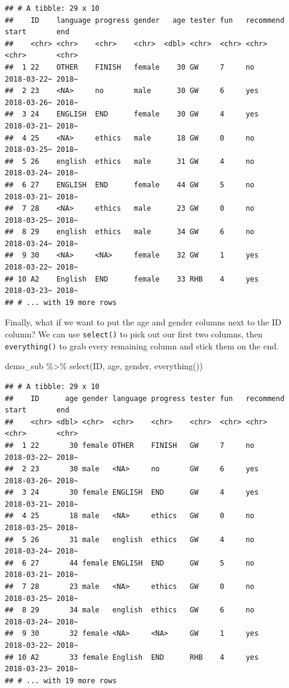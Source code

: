 \documentclass[
]{book}
\newenvironment{Shaded}{\begin{snugshade}}{\end{snugshade}}
\newcommand{\FunctionTok}[1]{\textcolor[rgb]{0.00,0.00,0.00}{#1}}
\newcommand{\NormalTok}[1]{#1}
\newcommand{\SpecialCharTok}[1]{\textcolor[rgb]{0.00,0.00,0.00}{#1}}
\begin{document}
\begin{verbatim}
## # A tibble: 29 x 10
##    ID    language progress gender   age tester fun   recommend start       end  
##    <chr> <chr>    <chr>    <chr>  <dbl> <chr>  <chr> <chr>     <chr>       <chr>
##  1 22    OTHER    FINISH   female    30 GW     7     no        2018-03-22~ 2018~
##  2 23    <NA>     no       male      30 GW     6     yes       2018-03-26~ 2018~
##  3 24    ENGLISH  END      female    30 GW     4     yes       2018-03-21~ 2018~
##  4 25    <NA>     ethics   male      18 GW     0     no        2018-03-25~ 2018~
##  5 26    english  ethics   male      31 GW     4     no        2018-03-24~ 2018~
##  6 27    ENGLISH  END      female    44 GW     5     no        2018-03-21~ 2018~
##  7 28    <NA>     ethics   male      23 GW     0     no        2018-03-25~ 2018~
##  8 29    english  ethics   male      34 GW     6     no        2018-03-24~ 2018~
##  9 30    <NA>     <NA>     female    32 GW     1     yes       2018-03-22~ 2018~
## 10 A2    English  END      female    33 RHB    4     yes       2018-03-23~ 2018~
## # ... with 19 more rows
\end{verbatim}

Finally, what if we want to put the age and gender columns next to the ID column? We can use \texttt{select()} to pick out our first two columns, then \texttt{everything()} to grab every remaining column and stick them on the end.

\begin{Shaded}
\begin{Highlighting}[]
\NormalTok{demo\_sub }\SpecialCharTok{\%\textgreater{}\%} \FunctionTok{select}\NormalTok{(ID, age, gender, }\FunctionTok{everything}\NormalTok{())}
\end{Highlighting}
\end{Shaded}

\begin{verbatim}
## # A tibble: 29 x 10
##    ID      age gender language progress tester fun   recommend start       end  
##    <chr> <dbl> <chr>  <chr>    <chr>    <chr>  <chr> <chr>     <chr>       <chr>
##  1 22       30 female OTHER    FINISH   GW     7     no        2018-03-22~ 2018~
##  2 23       30 male   <NA>     no       GW     6     yes       2018-03-26~ 2018~
##  3 24       30 female ENGLISH  END      GW     4     yes       2018-03-21~ 2018~
##  4 25       18 male   <NA>     ethics   GW     0     no        2018-03-25~ 2018~
##  5 26       31 male   english  ethics   GW     4     no        2018-03-24~ 2018~
##  6 27       44 female ENGLISH  END      GW     5     no        2018-03-21~ 2018~
##  7 28       23 male   <NA>     ethics   GW     0     no        2018-03-25~ 2018~
##  8 29       34 male   english  ethics   GW     6     no        2018-03-24~ 2018~
##  9 30       32 female <NA>     <NA>     GW     1     yes       2018-03-22~ 2018~
## 10 A2       33 female English  END      RHB    4     yes       2018-03-23~ 2018~
## # ... with 19 more rows
\end{verbatim}
\end{document}
